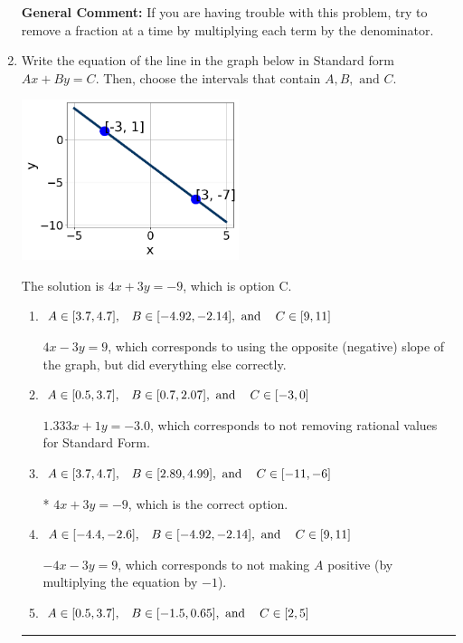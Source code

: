 \documentclass{extbook}[14pt]
\newcommand{\litem}[1]{\item #1

\rule{\textwidth}{0.4pt}}
\begin{document}
\begin{enumerate}
{\textbf{General Comment:} If you are having trouble with this problem, try to remove a fraction at a time by multiplying each term by the denominator.
}
\litem{
Write the equation of the line in the graph below in Standard form $Ax+By=C$. Then, choose the intervals that contain $A, B, \text{ and } C$.

\begin{center}
    \includegraphics[width=0.5\textwidth]{../Figures/linearGraphToStandardB.png}
\end{center}




The solution is \( 4x + 3y = -9 \), which is option C.\begin{enumerate}[label=\Alph*.]
\item \( A \in [3.7, 4.7], \hspace{3mm} B \in [-4.92, -2.14], \text{ and } \hspace{3mm} C \in [9, 11] \)

 $4x - 3y = 9$, which corresponds to using the opposite (negative) slope of the graph, but did everything else correctly.
\item \( A \in [0.5, 3.7], \hspace{3mm} B \in [0.7, 2.07], \text{ and } \hspace{3mm} C \in [-3, 0] \)

 $1.333x + 1y = -3.0$, which corresponds to not removing rational values for Standard Form.
\item \( A \in [3.7, 4.7], \hspace{3mm} B \in [2.89, 4.99], \text{ and } \hspace{3mm} C \in [-11, -6] \)

* $4x + 3y = -9$, which is the correct option.
\item \( A \in [-4.4, -2.6], \hspace{3mm} B \in [-4.92, -2.14], \text{ and } \hspace{3mm} C \in [9, 11] \)

 $-4x - 3y = 9$, which corresponds to not making $A$ positive (by multiplying the equation by $-1$).
\item \( A \in [0.5, 3.7], \hspace{3mm} B \in [-1.5, 0.65], \text{ and } \hspace{3mm} C \in [2, 5] \)


\end{enumerate}}
\end{enumerate}
\end{document}
